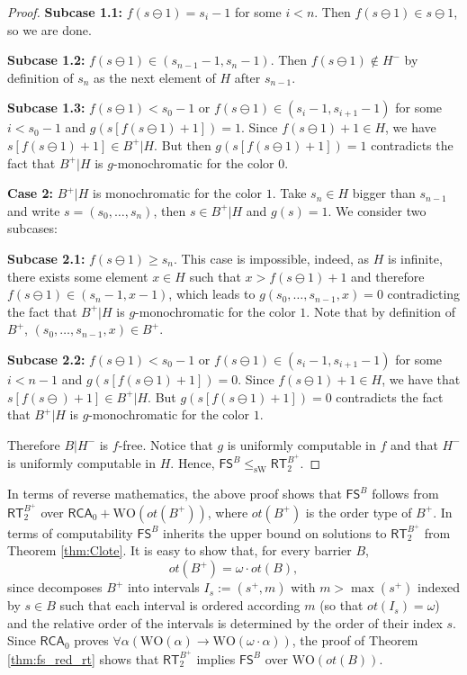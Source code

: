\documentclass{amsart}
\theoremstyle{plain}
\theoremstyle{plain}
\newcommand{\om}{\omega}
\newcommand\RCA{\mathsf{RCA}}
\newcommand\RT{\mathsf{RT}}
\newcommand\FS{\mathsf{FS}}
\newcommand\sW{\mathrm{sW}}
\newcommand\WO{\mathrm{WO}}
\begin{document}
\begin{proof}
\textbf{Subcase 1.1:} $f(s \ominus 1) = s_i - 1$ for some $i < n$. 
Then $f(s\ominus 1)\in s\ominus 1$, so we are done.

\textbf{Subcase 1.2:} $f(s \ominus 1) \in (s_{n - 1} - 1, s_{n} - 1)$. 
Then $f(s\ominus 1)\notin H^-$ by definition of $s_n$ as the next element of $H$ after $s_{n-1}$.

\textbf{Subcase 1.3:} $f(s \ominus 1) < s_0 - 1$ or  $f(s \ominus 1) \in (s_i - 1, s_{i+1} - 1)$ for some $i < s_0 - 1$ and $g(s[f(s \ominus 1)+1]) = 1$. 
Since $f(s\ominus 1)+1 \in H$, we have $s[f(s\ominus 1)+1] \in B^+\vert H$. But then 
$g(s[f(s \ominus 1)+1]) = 1$ contradicts the fact that $B^+\vert H$ is $g$-monochromatic for the color $0$. 

\textbf{Case 2:} $B^+\vert H$ is monochromatic for the color $1$. Take $s_n \in H$ bigger than $s_{n - 1}$ and write $s = (s_0, \dots, s_{n})$, then $s \in B^+\vert H$ and $g(s) = 1$. We consider two subcases:

\textbf{Subcase 2.1:} $f(s \ominus 1) \geq s_{n}$. This case is impossible, indeed, as $H$ is infinite, there exists some element $x \in H$ such that $x > f(s \ominus 1) + 1$ and therefore $f(s \ominus 1) \in (s_{n} - 1, x - 1)$, which leads to $g(s_0, \dots, s_{n - 1}, x) = 0$ contradicting the fact that $B^+\vert H$ is $g$-monochromatic for the color $1$. Note that by definition of $B^+$, $(s_0, \dots, s_{n - 1}, x)\in B^+$. 

\textbf{Subcase 2.2:} $f(s \ominus 1) < s_0 - 1$ or $f(s \ominus 1) \in (s_i - 1, s_{i+1} - 1)$ for some $i < n - 1$ and $g(s[f(s \ominus 1)+1]) = 0$.  
Since $f(s\ominus 1)+1 \in H$, we have that $s[f(s\ominus )+1] \in B^+\vert H$. But 
$g(s[f(s \ominus 1)+1]) = 0$ contradicts the fact that $B^+\vert H$ is $g$-monochromatic for the color $1$. 

Therefore $B\vert H^-$ is $f$-free.
Notice that $g$ is uniformly computable in $f$ and that $H^-$ is uniformly computable in $H$. Hence, $\FS^B \leq_{\sW} \RT^{B^+}_2$.
 \end{proof}

In terms of reverse mathematics, the above proof shows that $\FS^B$ follows from $\RT^{B^+}_2$ over $\RCA_0 + \WO(ot(B^+))$, where $ot(B^+)$ is the order type of $B^+$. In terms of computability $\FS^B$ inherits the upper bound on solutions to $\RT^{B^+}_2$ from Theorem \ref{thm:Clote}. 
It is easy to show that, for every barrier $B$,
$$ot(B^+)= \omega\cdot ot(B),$$
since decomposes $B^+$ into intervals $I_s:=(s^+,m)$ with $m>\max(s^+)$ indexed by $s\in B$ such that each interval is ordered according $m$ (so that $ot(I_s) =\om$) and the relative order of the intervals is determined by the order of their index $s$.
Since $\RCA_0$ proves $\forall \alpha(\WO(\alpha) \to \WO(\omega\cdot\alpha))$, the proof of Theorem \ref{thm:fs_red_rt} shows that $\RT^{B^+}_2$ implies $\FS^B$ over $\WO(ot(B))$. 
\end{document}
